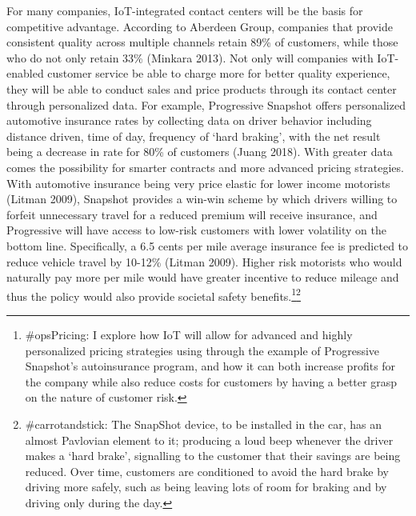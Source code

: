 \documentclass[11pt]{article}
\begin{document}
For many companies, IoT-integrated contact centers will be the basis for competitive advantage. According to Aberdeen Group, companies that provide consistent quality across multiple channels retain 89\% of customers, while those who do not only retain 33\% (Minkara 2013). Not only will companies with IoT-enabled customer service be able to charge more for better quality experience, they will be able to conduct sales and price products through its contact center through personalized data. For example, Progressive Snapshot offers personalized automotive insurance rates by collecting data on driver behavior including distance driven, time of day, frequency of `hard braking', with the net result being a decrease in rate for 80\% of customers (Juang 2018). With greater data comes the possibility for smarter contracts and more advanced pricing strategies. With automotive insurance being very price elastic for lower income motorists (Litman 2009), Snapshot provides a win-win scheme by which drivers willing to forfeit unnecessary travel for a reduced premium will receive insurance, and Progressive will have access to low-risk customers with lower volatility on the bottom line. Specifically, a 6.5 cents per mile average insurance fee is predicted to reduce vehicle travel by 10-12\% (Litman 2009). Higher risk motorists who would naturally pay more per mile would have greater incentive to reduce mileage and thus the policy would also provide societal safety benefits.\footnote{\#opsPricing: I explore how IoT will allow for advanced and highly personalized pricing strategies using through the example of Progressive Snapshot's autoinsurance program, and how it can both increase profits for the company while also reduce costs for customers by having a better grasp on the nature of customer risk. }\footnote{\#carrotandstick: The SnapShot device, to be installed in the car, has an almost Pavlovian element to it; producing a loud beep whenever the driver makes a `hard brake', signalling to the customer that their savings are being reduced. Over time, customers are conditioned to avoid the hard brake by driving more safely, such as being leaving lots of room for braking and by driving only during the day.}\\
\end{document}
